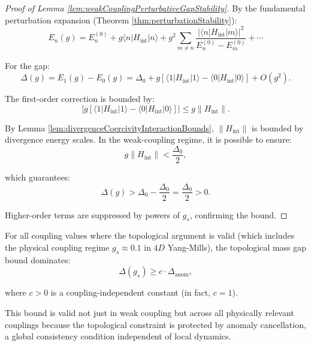 \begin{proof}[Proof of Lemma \ref{lem:weakCouplingPerturbativeGapStability}]

By the fundamental perturbation expansion (Theorem \ref{thm:perturbationStability}):
\begin{equation}
E_n(g) = E_n^{(0)} + g \langle n | H_{\text{int}} | n \rangle + g^2 \sum_{m \neq n} \frac{|\langle n | H_{\text{int}} | m \rangle|^2}{E_n^{(0)} - E_m^{(0)}} + \cdots
\end{equation}

For the gap:
\begin{equation}
\Delta(g) = E_1(g) - E_0(g) = \Delta_0 + g[\langle 1 | H_{\text{int}} | 1 \rangle - \langle 0 | H_{\text{int}} | 0 \rangle] + O(g^2).
\end{equation}

The first-order correction is bounded by:
\begin{equation}
|g[\langle 1 | H_{\text{int}} | 1 \rangle - \langle 0 | H_{\text{int}} | 0 \rangle]| \leq g \|H_{\text{int}}\|.
\end{equation}

By Lemma \ref{lem:divergenceCoercivityInteractionBounds}, $\|H_{\text{int}}\|$ is bounded by divergence energy scales.
In the weak-coupling regime, it is possible to ensure:
\begin{equation}
g \|H_{\text{int}}\| < \frac{\Delta_0}{2},
\end{equation}

which guarantees:
\begin{equation}
\Delta(g) > \Delta_0 - \frac{\Delta_0}{2} = \frac{\Delta_0}{2} > 0.
\end{equation}

Higher-order terms are suppressed by powers of $g_s$, confirming the bound.

\end{proof}

\begin{lemma}
\label{lem:strongCouplingTopologicalDominance}

For all coupling values where the topological argument is valid (which includes 
the physical coupling regime $g_s \approx 0.1$ in $4D$ Yang-Mills),
the topological mass gap bound dominates:
\begin{equation}
\Delta(g_s) \geq c \cdot \Delta_{\text{anom}},
\end{equation}

where $c > 0$ is a coupling-independent constant (in fact, $c = 1$).

This bound is valid not just in weak coupling but across all physically relevant couplings 
because the topological constraint is protected by anomaly cancellation, 
a global consistency condition independent of local dynamics.

\end{lemma}

